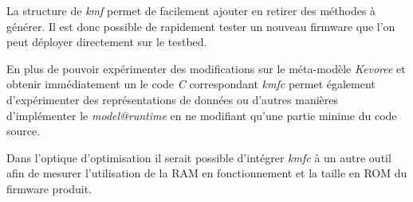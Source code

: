 La structure de \emph{kmf} permet de facilement ajouter en retirer des méthodes à générer. Il est donc possible de rapidement tester un nouveau firmware que l'on peut déployer directement sur le testbed.

En plus de pouvoir expérimenter des modifications sur le méta-modèle \emph{Kevoree} et obtenir immédiatement un le code \emph{C} correspondant \emph{kmfc} permet également d'expérimenter des représentations de données ou d'autres manières d'implémenter le \emph{model@runtime} en ne modifiant qu'une partie minime du code source.


Dans l'optique d'optimisation il serait possible d'intégrer \emph{kmfc} à un autre outil afin de mesurer l'utilisation de la RAM en fonctionnement et la taille en ROM du firmware produit.